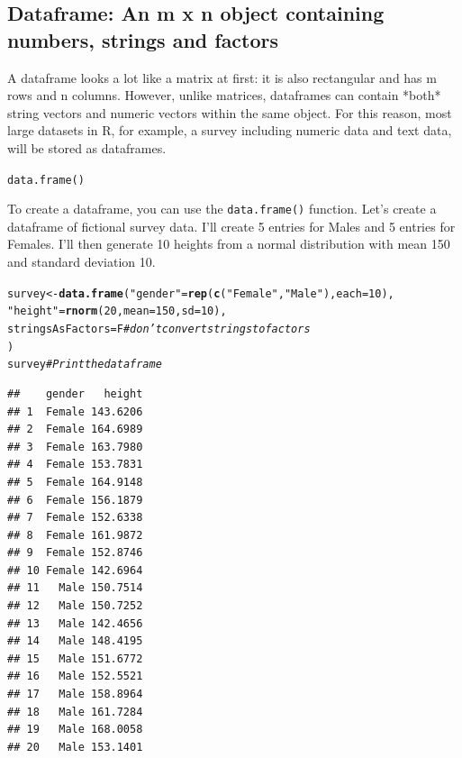 \documentclass{tufte-book}\usepackage[]{graphicx}\usepackage[]{color}
\makeatletter
\newcommand{\hlnum}[1]{\textcolor[rgb]{0.686,0.059,0.569}{#1}}%
\newcommand{\hlstr}[1]{\textcolor[rgb]{0.192,0.494,0.8}{#1}}%
\newcommand{\hlcom}[1]{\textcolor[rgb]{0.678,0.584,0.686}{\textit{#1}}}%
\newcommand{\hlstd}[1]{\textcolor[rgb]{0.345,0.345,0.345}{#1}}%
\newcommand{\hlkwb}[1]{\textcolor[rgb]{0.69,0.353,0.396}{#1}}%
\newcommand{\hlkwc}[1]{\textcolor[rgb]{0.333,0.667,0.333}{#1}}%
\newcommand{\hlkwd}[1]{\textcolor[rgb]{0.737,0.353,0.396}{\textbf{#1}}}%
\newenvironment{kframe}{%
 \def\at@end@of@kframe{}%
 \ifinner\ifhmode%
  \def\at@end@of@kframe{\end{minipage}}%
  \begin{minipage}{\columnwidth}%
 \fi\fi%
 \def\FrameCommand##1{\hskip\@totalleftmargin \hskip-\fboxsep
 \colorbox{shadecolor}{##1}\hskip-\fboxsep
     \hskip-\linewidth \hskip-\@totalleftmargin \hskip\columnwidth}%
 \MakeFramed {\advance\hsize-\width
   \@totalleftmargin\z@ \linewidth\hsize
   \@setminipage}}%
 {\par\unskip\endMakeFramed%
 \at@end@of@kframe}
\newenvironment{knitrout}{}{} %
\newcommand{\newfun}[1]{\begin{LARGE} \begin{center} \texttt{#1} \end{center} \end{LARGE}}
\makeatother
\begin{document}
\begin{footnotesize}
\subsection{Dataframe: An m x n object containing numbers, strings and factors}

A dataframe looks a lot like a matrix at first: it is also rectangular and has m rows and n columns. However, unlike matrices, dataframes can contain *both* string vectors and numeric vectors within the same object. For this reason, most large datasets in R, for example, a survey including numeric data and text data, will be stored as dataframes.


\newfun{data.frame()}

To create a dataframe, you can use the \texttt{data.frame()} function. Let's create a dataframe of fictional survey data. I'll create 5 entries for Males and 5 entries for Females. I'll then generate 10 heights from a normal distribution with mean 150 and standard deviation 10.

\begin{footnotesize}
\begin{knitrout}
\color{fgcolor}\begin{kframe}
\begin{alltt}
\hlstd{survey} \hlkwb{<-} \hlkwd{data.frame}\hlstd{(}\hlstr{"gender"} \hlstd{=} \hlkwd{rep}\hlstd{(}\hlkwd{c}\hlstd{(}\hlstr{"Female"}\hlstd{,} \hlstr{"Male"}\hlstd{),} \hlkwc{each} \hlstd{=} \hlnum{10}\hlstd{),}
                     \hlstr{"height"} \hlstd{=} \hlkwd{rnorm}\hlstd{(}\hlnum{20}\hlstd{,} \hlkwc{mean} \hlstd{=} \hlnum{150}\hlstd{,} \hlkwc{sd} \hlstd{=} \hlnum{10}\hlstd{),}
                     \hlkwc{stringsAsFactors} \hlstd{= F} \hlcom{# don't convert strings to factors}
                    \hlstd{)}
\hlstd{survey} \hlcom{# Print the dataframe}
\end{alltt}
\begin{verbatim}
##    gender   height
## 1  Female 143.6206
## 2  Female 164.6989
## 3  Female 163.7980
## 4  Female 153.7831
## 5  Female 164.9148
## 6  Female 156.1879
## 7  Female 152.6338
## 8  Female 161.9872
## 9  Female 152.8746
## 10 Female 142.6964
## 11   Male 150.7514
## 12   Male 150.7252
## 13   Male 142.4656
## 14   Male 148.4195
## 15   Male 151.6772
## 16   Male 152.5521
## 17   Male 158.8964
## 18   Male 161.7284
## 19   Male 168.0058
## 20   Male 153.1401
\end{verbatim}
\end{kframe}
\end{knitrout}
\end{footnotesize}


\end{footnotesize}
\end{document}

